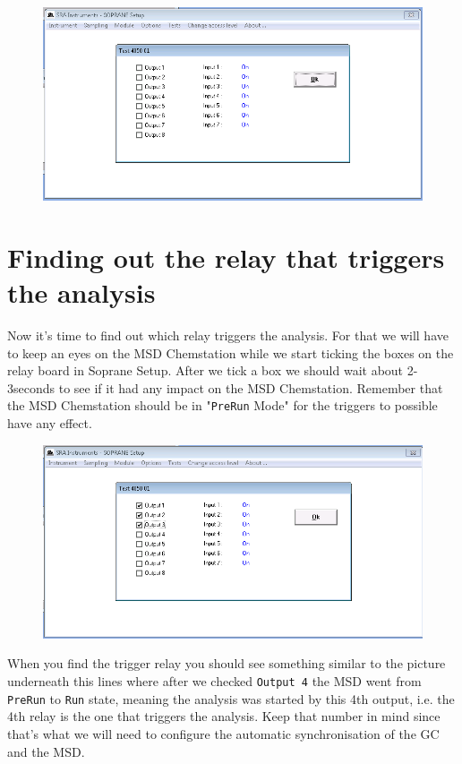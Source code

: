 \documentclass[31pt]{article}
\begin{document}
\begin{figure}[h]
\centering
\includegraphics[width=1\textwidth]{6RelayBoard.png}
\label{fig:univerise}
\end{figure}



\section{Finding out the relay that triggers the analysis}

Now it's time to find out which relay triggers the analysis. For that we will have to keep an eyes on the MSD Chemstation while we start ticking the boxes on the relay board in Soprane Setup. After we tick a box we should wait about 2-3seconds to see if it had any impact on the MSD Chemstation. Remember that the MSD Chemstation should be in "\texttt{PreRun} Mode" for the triggers to possible have any effect.

\begin{figure}[h]
\centering
\includegraphics[width=.7\textwidth]{7TickingRelays.png}
\label{fig:univerise}
\end{figure}

When you find the trigger relay you should see something similar to the picture underneath this lines where after we checked \texttt{Output 4} the MSD went from \texttt{PreRun} to \texttt{Run} state, meaning the analysis was started by this 4th output, i.e. the 4th relay is the one that triggers the analysis. Keep that number in mind since that's what we will need to configure the automatic synchronisation of the GC and the MSD.
\end{document}
